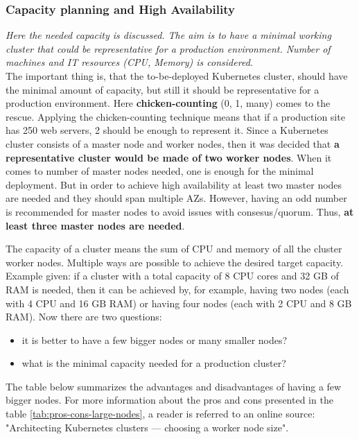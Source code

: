 \subsubsection{Capacity planning and High Availability}
\textit{Here the needed capacity is discussed. The aim is to have a minimal working cluster that could be representative for a production environment. Number of machines and IT resources (CPU, Memory) is considered.}
\\

The important thing is, that the to-be-deployed Kubernetes cluster, should have the minimal amount of capacity, but still it should be representative for a production environment. Here \textbf{chicken-counting} (0, 1, many) comes to the rescue. Applying the chicken-counting technique means that if a production site has 250 web servers, 2 should be enough to represent it\cite{book-cicd}. Since a Kubernetes cluster consists of a master node and worker nodes, then it was decided that \textbf{a representative cluster would be made of two worker nodes}. When it comes to number of master nodes needed, one is enough for the minimal deployment. But in order to achieve high availability at least two master nodes are needed and they should span multiple AZs\cite{article-aws-architecting}. However, having an odd number is recommended for master nodes to avoid issues with consesus/quorum. Thus, \textbf{at least three master nodes are needed}\cite{online-ha-k8s-blog}\cite{online-kops-ha}.

The capacity of a cluster means the sum of CPU and memory of all the cluster worker nodes. Multiple ways are possible to achieve the desired target capacity. Example given: if a cluster with a total capacity of 8 CPU cores and 32 GB of RAM is needed, then it can be achieved by, for example, having two nodes (each with 4 CPU and 16 GB RAM) or having four nodes (each with 2 CPU and 8 GB RAM)\cite{kubernetes-node-size}. Now there are two questions:
\begin{itemize}
\item it is better to have a few bigger nodes or many smaller nodes?
\item what is the minimal capacity needed for a production cluster?
\end{itemize}

The table below summarizes the advantages and disadvantages of having a few bigger nodes. For more information about the pros and cons presented in the table \ref{tab:pros-cons-large-nodes}, a reader is referred to an online source: "Architecting Kubernetes clusters — choosing a worker node size"\cite{kubernetes-node-size}.

